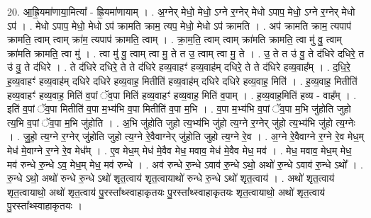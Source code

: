 \documentclass[17pt]{extarticle}
\begin{document}
20. आ॒ह्रि॒यमा॑णाया॒मित्या᳚ - ह्रि॒यमा॑णायाम् । . अ॒ग्नेर् मेधो॒ मेधो॒ ऽग्ने र॒ग्नेर् मेधो ऽपाप॒ मेधो॒ ऽग्ने र॒ग्नेर् मेधो ऽप॑ । . मेधो ऽपाप॒ मेधो॒ मेधो ऽप॑ क्रामति क्राम॒ त्यप॒ मेधो॒ मेधो ऽप॑ क्रामति । . अप॑ क्रामति क्राम॒ त्यपाप॑ क्रामति॒ त्वाम् त्वाम् क्रा॑म॒ त्यपाप॑ क्रामति॒ त्वाम् । . क्रा॒म॒ति॒ त्वाम् त्वाम् क्रा॑मति क्रामति॒ त्वा मु॑ वु॒ त्वाम् क्रा॑मति क्रामति॒ त्वा मु॑ । . त्वा मु॑ वु॒ त्वाम् त्वा मु॒ ते त उ॒ त्वाम् त्वा मु॒ ते । . उ॒ ते त उ॑ वु॒ ते द॑धिरे दधिरे॒ त उ॑ वु॒ ते द॑धिरे । . ते द॑धिरे दधिरे॒ ते ते द॑धिरे हव्य॒वाहꣳ॑ हव्य॒वाह॑म् दधिरे॒ ते ते द॑धिरे हव्य॒वाह᳚म् । . द॒धि॒रे॒ ह॒व्य॒वाहꣳ॑ हव्य॒वाह॑म् दधिरे दधिरे हव्य॒वाह॒ मितीति॑ हव्य॒वाह॑म् दधिरे दधिरे हव्य॒वाह॒ मिति॑ । . ह॒व्य॒वाह॒ मितीति॑ हव्य॒वाहꣳ॑ हव्य॒वाह॒ मिति॑ व॒पां ॅव॒पा मिति॑ हव्य॒वाहꣳ॑ हव्य॒वाह॒ मिति॑ व॒पाम् । . ह॒व्य॒वाह॒मिति॑ हव्य - वाह᳚म् । . इति॑ व॒पां ॅव॒पा मितीति॑ व॒पा म॒भ्य॑भि व॒पा मितीति॑ व॒पा म॒भि । . व॒पा म॒भ्य॑भि व॒पां ॅव॒पा म॒भि जु॑होति जुहो त्य॒भि व॒पां ॅव॒पा म॒भि जु॑होति । . अ॒भि जु॑होति जुहो त्य॒भ्य॑भि जु॑हो त्य॒ग्ने र॒ग्नेर् जु॑हो त्य॒भ्य॑भि जु॑हो त्य॒ग्नेः । . जु॒हो॒ त्य॒ग्ने र॒ग्नेर् जु॑होति जुहो त्य॒ग्ने रे॒वैवाग्नेर् जु॑होति जुहो त्य॒ग्ने रे॒व । . अ॒ग्ने रे॒वैवाग्ने र॒ग्ने रे॒व मेध॒म् मेध॑ मे॒वाग्ने र॒ग्ने रे॒व मेध᳚म् । . ए॒व मेध॒म् मेध॑ मे॒वैव मेध॒ मवाव॒ मेध॑ मे॒वैव मेध॒ मव॑ । . मेध॒ मवाव॒ मेध॒म् मेध॒ मव॑ रुन्धे रु॒न्धे ऽव॒ मेध॒म् मेध॒ मव॑ रुन्धे । . अव॑ रुन्धे रु॒न्धे ऽवाव॑ रु॒न्धे ऽथो॒ अथो॑ रु॒न्धे ऽवाव॑ रु॒न्धे ऽथो᳚ । . रु॒न्धे ऽथो॒ अथो॑ रुन्धे रु॒न्धे ऽथो॑ शृत॒त्वाय॑ शृत॒त्वायाथो॑ रुन्धे रु॒न्धे ऽथो॑ शृत॒त्वाय॑ । . अथो॑ शृत॒त्वाय॑ शृत॒त्वायाथो॒ अथो॑ शृत॒त्वाय॑ पु॒रस्ता᳚थ्स्वाहाकृतयः पु॒रस्ता᳚थ्स्वाहाकृतयः शृत॒त्वायाथो॒ अथो॑ शृत॒त्वाय॑ पु॒रस्ता᳚थ्स्वाहाकृतयः । \newline
\end{document}
